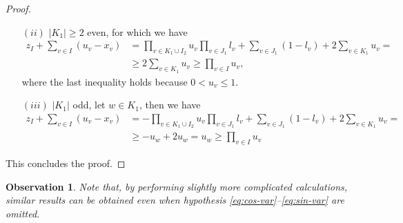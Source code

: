 \documentclass{article}
\newtheorem{observation}[theorem]{Observation}
\begin{document}
\begin{proof}
\begin{itemize}
			\item[\((ii)\)]  \(|K_1| \geq 2\) even, for which we have
			\begin{align*}
				z_I + \sum_{v \in I} (u_v - x_v) & = \prod_{v \in K_1 \cup I_2}u_v \prod_{v \in J_1} l_v+ \sum_{v \in J_1} (1 - l_v) + 2\sum_{v \in K_1}u_v =\\
				& \geq 2\sum_{v \in K_1}u_v  \geq  \prod_{v \in I} u_v,
			\end{align*}
			where the last inequality holds because \(0 < u_v \leq 1\).
			\item[\((iii)\)]  \(|K_1| \) odd, let \(w \in K_1\), then we have
			\begin{align*}
				z_I + \sum_{v \in I} (u_v - x_v) & =  -\prod_{v \in K_1 \cup I_2}u_v \prod_{v \in J_1} l_v+ \sum_{v \in J_1} (1 - l_v) + 2\sum_{v \in K_1}u_v = \\
				& \geq -u_w + 2 u_w = u_w \geq \prod_{v \in I} u_v
			\end{align*}
		\end{itemize}
		This concludes the proof.
	\end{proof}
	\begin{observation}
		Note that, by performing slightly more complicated calculations, similar results can be obtained even when hypothesis \eqref{eq:cos-var}--\eqref{eq:sin-var} are omitted.
	\end{observation}
\end{document}
